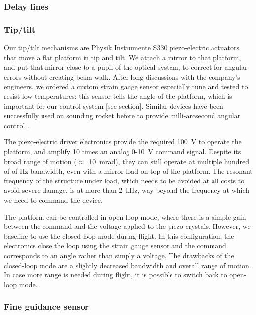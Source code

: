 \subsubsection{Delay lines}
\subsubsection{Tip/tilt}

Our tip/tilt mechanisms are Physik Instrumente S330 piezo-electric actuators that move a flat platform in tip and tilt. We attach a mirror to that platform, and put that mirror close to a pupil of the optical system, to correct for angular errors without creating beam walk. After long discussions with the company's engineers, we ordered a custom strain gauge sensor especially tune and tested to resist low temperatures: this sensor tells the angle of the platform, which is important for our control system [see section]. Similar devices have been successfully used on sounding rocket before to provide milli-arcsecond angular control \citep{Mendillo:2012fh}. 

The piezo-electric driver electronics provide the required \SI{100}{\volt} to operate the platform, and amplify 10 times an analog 0-10~\si{\volt} command signal. Despite its broad range of motion ($\approx$~\SI{10}{\milli\radian}), they can still operate at multiple hundred of of \si{\hertz} bandwidth, even with a mirror load on top of the platform. The resonant frequency of the structure under load, which needs to be avoided at all costs to avoid severe damage, is at more than \SI{2}{\kilo\hertz}, way beyond the frequency at which we need to command the device.

The platform can be controlled in open-loop mode, where there is a simple gain between the command and the voltage applied to the piezo crystals. However, we baseline to use the closed-loop mode during flight. In this configuration, the electronics close the loop using the strain gauge sensor and the command corresponds to an angle rather than simply a voltage. The drawbacks of the closed-loop mode are a slightly decreased bandwidth and overall range of motion. In case more range is needed during flight, it is possible to switch back to open-loop mode. 


 
 
\subsubsection{Fine guidance sensor}

